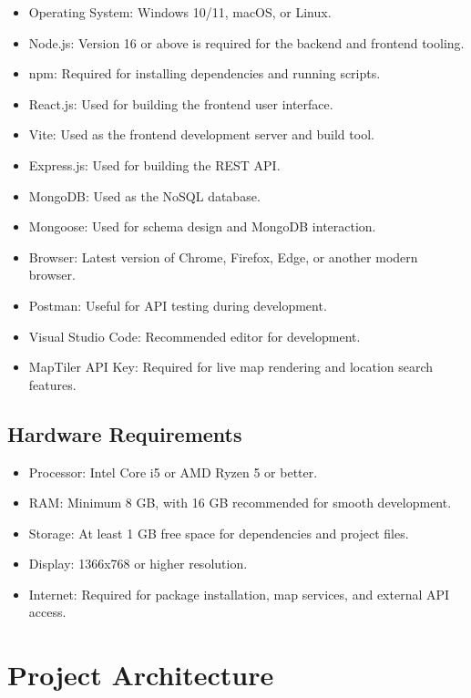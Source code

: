 \documentclass[12pt,a4paper]{article}
\begin{document}
\begin{itemize}
  \item Operating System: Windows 10/11, macOS, or Linux.
  \item Node.js: Version 16 or above is required for the backend and frontend tooling.
  \item npm: Required for installing dependencies and running scripts.
  \item React.js: Used for building the frontend user interface.
  \item Vite: Used as the frontend development server and build tool.
  \item Express.js: Used for building the REST API.
  \item MongoDB: Used as the NoSQL database.
  \item Mongoose: Used for schema design and MongoDB interaction.
  \item Browser: Latest version of Chrome, Firefox, Edge, or another modern browser.
  \item Postman: Useful for API testing during development.
  \item Visual Studio Code: Recommended editor for development.
  \item MapTiler API Key: Required for live map rendering and location search features.
\end{itemize}

\subsection{Hardware Requirements}

\begin{itemize}
  \item Processor: Intel Core i5 or AMD Ryzen 5 or better.
  \item RAM: Minimum 8 GB, with 16 GB recommended for smooth development.
  \item Storage: At least 1 GB free space for dependencies and project files.
  \item Display: 1366x768 or higher resolution.
  \item Internet: Required for package installation, map services, and external API access.
\end{itemize}

\section{Project Architecture}
\end{document}
